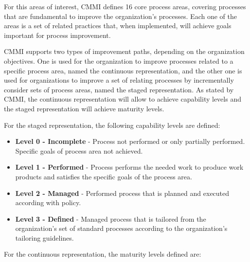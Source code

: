 For this areas of interest, CMMI defines 16 core process areas, covering processes that are fundamental to improve the organization's processes. Each one of the areas is a set of related practices that, when implemented, will achieve goals important for process improvement.\par
CMMI supports two types of improvement paths, depending on the organization objectives. One is used for the organization to improve processes related to a specific process area, named the continuous representation, and the other one is used for organizations to improve a set of relating processes by incrementally consider sets of process areas, named the staged representation. As stated by CMMI, the continuous representation will allow to achieve capability levels and the staged representation will achieve maturity levels.\par
For the staged representation, the following capability levels are defined:

\begin{itemize}

\item \textbf{Level 0 - Incomplete} - Process not performed or only partially performed. Specific goals of process area not achieved.

\item \textbf{Level 1 - Performed} - Process performs the needed work to produce work products and satisfies the specific goals of the process area.

\item \textbf{Level 2 - Managed} - Performed process that is planned and executed according with policy.

\item \textbf{Level 3 - Defined} - Managed process that is tailored from the organization's set of standard processes according to the organization's tailoring guidelines.
 
\end{itemize}

For the continuous representation, the maturity levels defined are:


